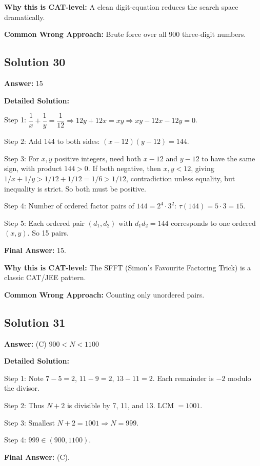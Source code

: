 \documentclass[11pt]{article}
\begin{document}
\textbf{Why this is CAT-level:} A clean digit-equation reduces the search space dramatically.

\textbf{Common Wrong Approach:} Brute force over all 900 three-digit numbers.

\subsection*{Solution 30}
\textbf{Answer:} 15

\textbf{Detailed Solution:}

Step 1: $\dfrac{1}{x} + \dfrac{1}{y} = \dfrac{1}{12} \Rightarrow 12 y + 12 x = xy \Rightarrow xy - 12x - 12y = 0$.

Step 2: Add 144 to both sides: $(x - 12)(y - 12) = 144$.

Step 3: For $x, y$ positive integers, need both $x - 12$ and $y - 12$ to have the same sign, with product $144 > 0$. If both negative, then $x, y < 12$, giving $1/x + 1/y > 1/12 + 1/12 = 1/6 > 1/12$, contradiction unless equality, but inequality is strict. So both must be positive.

Step 4: Number of ordered factor pairs of $144 = 2^4 \cdot 3^2$: $\tau(144) = 5 \cdot 3 = 15$.

Step 5: Each ordered pair $(d_1, d_2)$ with $d_1 d_2 = 144$ corresponds to one ordered $(x, y)$. So 15 pairs.

\textbf{Final Answer:} 15.

\textbf{Why this is CAT-level:} The SFFT (Simon's Favourite Factoring Trick) is a classic CAT/JEE pattern.

\textbf{Common Wrong Approach:} Counting only unordered pairs.

\subsection*{Solution 31}
\textbf{Answer:} (C) $900 < N < 1100$

\textbf{Detailed Solution:}

Step 1: Note $7 - 5 = 2$, $11 - 9 = 2$, $13 - 11 = 2$. Each remainder is $-2$ modulo the divisor.

Step 2: Thus $N + 2$ is divisible by 7, 11, and 13. LCM $= 1001$.

Step 3: Smallest $N + 2 = 1001 \Rightarrow N = 999$.

Step 4: $999 \in (900, 1100)$.

\textbf{Final Answer:} (C).
\end{document}
